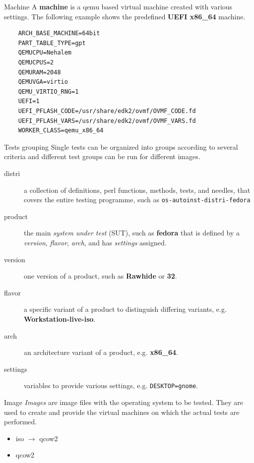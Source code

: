 \documentclass[12pt,aspectratio=169]{beamer}
\begin{document}
\begin{frame}[fragile]{Machine}
	A \textbf{machine} is a qemu based virtual machine created with various settings. The following example shows the predefined \textbf{UEFI x86\_64} machine. 
	
	\vspace{5pt}
	
	\begin{verbatim}
	ARCH_BASE_MACHINE=64bit
	PART_TABLE_TYPE=gpt
	QEMUCPU=Nehalem
	QEMUCPUS=2
	QEMURAM=2048
	QEMUVGA=virtio
	QEMU_VIRTIO_RNG=1
	UEFI=1
	UEFI_PFLASH_CODE=/usr/share/edk2/ovmf/OVMF_CODE.fd
	UEFI_PFLASH_VARS=/usr/share/edk2/ovmf/OVMF_VARS.fd
	WORKER_CLASS=qemu_x86_64
	\end{verbatim}
	
\end{frame}

\begin{frame}[fragile]{Tests grouping}
	Single tests can be organized into groups according to several criteria and different test groups can be run for different images.
	\begin{description}
		\item[distri] a collection of definitions, perl functions, methods, tests, and needles, that covers the entire testing programme, such as \verb|os-autoinst-distri-fedora|
		\item[product] the main \textit{system under test} (SUT), such as \textbf{fedora} that is defined by a \textit{version}, \textit{flavor}, \textit{arch}, and has \textit{settings} assigned.
		\item[version] one version of a product, such as \textbf{Rawhide} or \textbf{32}.
		\item[flavor] a specific variant of a product to distinguish differing variants, e.g. \textbf{Workstation-live-iso}.
		\item[arch] an architecture variant of a product, e.g. \textbf{x86\_64}.
		\item[settings] variables to provide various settings, e.g. \verb|DESKTOP=gnome|.
	\end{description}
\end{frame}


\begin{frame}[fragile]{Image}
\textit{Images} are image files with the operating system to be tested. They are used to create and provide the virtual machines on which the actual tests are performed.

\vspace{5pt}

	\begin{itemize}
		\item iso $\longrightarrow$ qcow2
		\item qcow2
	\end{itemize}
\end{frame}
\end{document}
